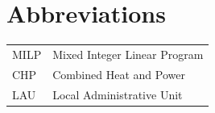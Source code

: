 \section*{Abbreviations}
\noindent
{}
\renewcommand{\arraystretch}{1.5}
\begin{tabular}{@{}Ll}

MILP & Mixed Integer Linear Program \\
CHP & Combined Heat and Power \\
LAU & Local Administrative Unit
\end{tabular}
